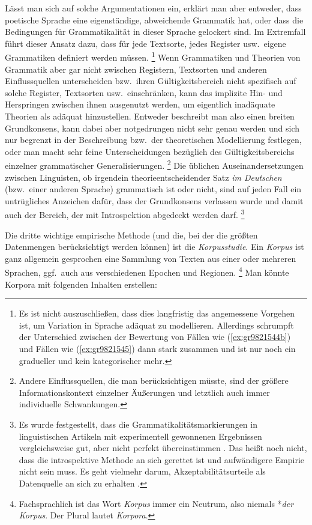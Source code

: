 Lässt man sich auf solche Argumentationen ein, erklärt man aber entweder, dass poetische Sprache eine eigenständige, abweichende Grammatik hat, oder dass die Bedingungen für Grammatikalität in dieser Sprache gelockert sind.
Im Extremfall führt dieser Ansatz dazu, dass für jede Textsorte, jedes Register usw.\ eigene Grammatiken definiert werden müssen.%
\footnote{Es ist nicht auszuschließen, dass dies langfristig das angemessene Vorgehen ist, um Variation in Sprache adäquat zu modellieren.
Allerdings schrumpft der Unterschied zwischen der Bewertung von Fällen wie (\ref{ex:gr9821544b}) und Fällen wie (\ref{ex:gr9821545}) dann stark zusammen und ist nur noch ein gradueller und kein kategorischer mehr.}
Wenn Grammatiken und Theorien von Grammatik aber gar nicht zwischen Registern, Textsorten und anderen Einflussquellen unterscheiden bzw.\ ihren Gültigkeitsbereich nicht spezifisch auf solche Register, Textsorten usw.\ einschränken, kann das implizite Hin- und Herspringen zwischen ihnen ausgenutzt werden, um eigentlich inadäquate Theorien als adäquat hinzustellen.
Entweder beschreibt man also einen breiten Grundkonsens, kann dabei aber notgedrungen nicht sehr genau werden und sich nur begrenzt in der Beschreibung bzw.\ der theoretischen Modellierung festlegen, oder man macht sehr feine Unterscheidungen bezüglich des Gültigkeitsbereichs einzelner grammatischer Generalisierungen.%
\footnote{Andere Einflussquellen, die man berücksichtigen müsste, sind \zB der größere Informationskontext einzelner Äußerungen und letztlich auch immer individuelle Schwankungen.}
Die üblichen Auseinandersetzungen zwischen Linguisten, ob irgendein theorieentscheidender Satz \textit{im Deutschen} (bzw.\ einer anderen Sprache) grammatisch ist oder nicht, sind auf jeden Fall ein untrügliches Anzeichen dafür, dass der Grundkonsens verlassen wurde und damit auch der Bereich, der mit Introspektion abgedeckt werden darf.%
\footnote{Es wurde festgestellt, dass die Grammatikalitätsmarkierungen in linguistischen Artikeln mit experimentell gewonnenen Ergebnissen vergleichsweise gut, aber nicht perfekt übereinstimmen \citep{SprouseEa2013}.
	Das heißt noch nicht, dass die introspektive Methode an sich gerettet ist und aufwändigere Empirie nicht sein muss.
	Es geht vielmehr darum, Akzeptabilitätsurteile als Datenquelle an sich zu erhalten \citep{SchuetzeSprouse2014}.}

	Die dritte wichtige empirische Methode (und die, bei der die größten Datenmengen berücksichtigt werden können) ist die \textit{Korpusstudie}.
Ein \textit{Korpus} ist ganz allgemein gesprochen eine Sammlung von Texten aus einer oder mehreren Sprachen, ggf.\ auch aus verschiedenen Epochen und Regionen.%
\footnote{Fachsprachlich ist das Wort \textit{Korpus} immer ein Neutrum, also niemals *\textit{der Korpus}.
Der Plural lautet \textit{Korpora}.}
Man könnte \zB Korpora mit folgenden Inhalten erstellen:

